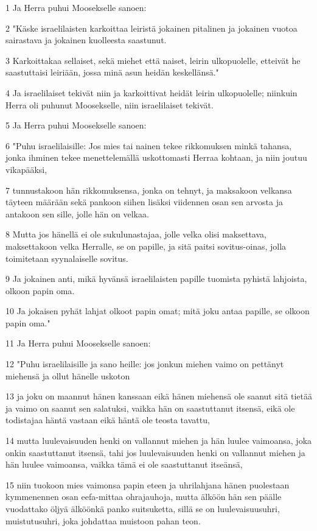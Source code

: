 \par 1 Ja Herra puhui Moosekselle sanoen:
\par 2 "Käske israelilaisten karkoittaa leiristä jokainen pitalinen ja jokainen vuotoa sairastava ja jokainen kuolleesta saastunut.
\par 3 Karkoittakaa sellaiset, sekä miehet että naiset, leirin ulkopuolelle, etteivät he saastuttaisi leiriään, jossa minä asun heidän keskellänsä."
\par 4 Ja israelilaiset tekivät niin ja karkoittivat heidät leirin ulkopuolelle; niinkuin Herra oli puhunut Moosekselle, niin israelilaiset tekivät.
\par 5 Ja Herra puhui Moosekselle sanoen:
\par 6 "Puhu israelilaisille: Jos mies tai nainen tekee rikkomuksen minkä tahansa, jonka ihminen tekee menettelemällä uskottomasti Herraa kohtaan, ja niin joutuu vikapääksi,
\par 7 tunnustakoon hän rikkomuksensa, jonka on tehnyt, ja maksakoon velkansa täyteen määrään sekä pankoon siihen lisäksi viidennen osan sen arvosta ja antakoon sen sille, jolle hän on velkaa.
\par 8 Mutta jos hänellä ei ole sukulunastajaa, jolle velka olisi maksettava, maksettakoon velka Herralle, se on papille, ja sitä paitsi sovitus-oinas, jolla toimitetaan syynalaiselle sovitus.
\par 9 Ja jokainen anti, mikä hyvänsä israelilaisten papille tuomista pyhistä lahjoista, olkoon papin oma.
\par 10 Ja jokaisen pyhät lahjat olkoot papin omat; mitä joku antaa papille, se olkoon papin oma."
\par 11 Ja Herra puhui Moosekselle sanoen:
\par 12 "Puhu israelilaisille ja sano heille: jos jonkun miehen vaimo on pettänyt miehensä ja ollut hänelle uskoton
\par 13 ja joku on maannut hänen kanssaan eikä hänen miehensä ole saanut sitä tietää ja vaimo on saanut sen salatuksi, vaikka hän on saastuttanut itsensä, eikä ole todistajaa häntä vastaan eikä häntä ole teosta tavattu,
\par 14 mutta luulevaisuuden henki on vallannut miehen ja hän luulee vaimoansa, joka onkin saastuttanut itsensä, tahi jos luulevaisuuden henki on vallannut miehen ja hän luulee vaimoansa, vaikka tämä ei ole saastuttanut itseänsä,
\par 15 niin tuokoon mies vaimonsa papin eteen ja uhrilahjana hänen puolestaan kymmenennen osan eefa-mittaa ohrajauhoja, mutta älköön hän sen päälle vuodattako öljyä älköönkä panko suitsuketta, sillä se on luulevaisuusuhri, muistutusuhri, joka johdattaa muistoon pahan teon.

